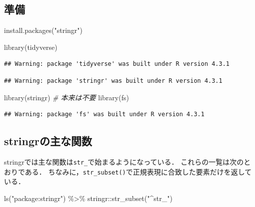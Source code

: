 \documentclass[
]{article}
\newenvironment{Shaded}{\begin{snugshade}}{\end{snugshade}}
\newcommand{\CommentTok}[1]{\textcolor[rgb]{0.56,0.35,0.01}{\textit{#1}}}
\newcommand{\FunctionTok}[1]{\textcolor[rgb]{0.00,0.00,0.00}{#1}}
\newcommand{\NormalTok}[1]{#1}
\newcommand{\SpecialCharTok}[1]{\textcolor[rgb]{0.00,0.00,0.00}{#1}}
\newcommand{\StringTok}[1]{\textcolor[rgb]{0.31,0.60,0.02}{#1}}
\begin{document}
\hypertarget{ux6e96ux5099-2}{%
\subsection{準備}\label{ux6e96ux5099-2}}

\begin{Shaded}
\begin{Highlighting}[]
\FunctionTok{install.packages}\NormalTok{(}\StringTok{"stringr"}\NormalTok{)}
\end{Highlighting}
\end{Shaded}

\begin{Shaded}
\begin{Highlighting}[]
\FunctionTok{library}\NormalTok{(tidyverse)}
\end{Highlighting}
\end{Shaded}

\begin{verbatim}
## Warning: package 'tidyverse' was built under R version 4.3.1
\end{verbatim}

\begin{verbatim}
## Warning: package 'stringr' was built under R version 4.3.1
\end{verbatim}

\begin{Shaded}
\begin{Highlighting}[]
\FunctionTok{library}\NormalTok{(stringr)  }\CommentTok{\# 本来は不要}
\FunctionTok{library}\NormalTok{(fs)}
\end{Highlighting}
\end{Shaded}

\begin{verbatim}
## Warning: package 'fs' was built under R version 4.3.1
\end{verbatim}

\hypertarget{stringrux306eux4e3bux306aux95a2ux6570}{%
\subsection{stringrの主な関数}\label{stringrux306eux4e3bux306aux95a2ux6570}}

stringrでは主な関数は\texttt{str\_}で始まるようになっている．
これらの一覧は次のとおりである．
ちなみに，\texttt{str\_subset()}で正規表現に合致した要素だけを返している．

\begin{Shaded}
\begin{Highlighting}[]
\FunctionTok{ls}\NormalTok{(}\StringTok{"package:stringr"}\NormalTok{) }\SpecialCharTok{\%\textgreater{}\%}
\NormalTok{  stringr}\SpecialCharTok{::}\FunctionTok{str\_subset}\NormalTok{(}\StringTok{"\^{}str\_"}\NormalTok{)}
\end{Highlighting}
\end{Shaded}
\end{document}
